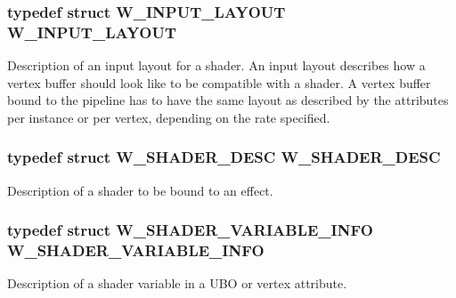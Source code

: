 \subsubsection[{\texorpdfstring{W\+\_\+\+I\+N\+P\+U\+T\+\_\+\+L\+A\+Y\+O\+UT}{W_INPUT_LAYOUT}}]{\setlength{\rightskip}{0pt plus 5cm}typedef struct {\bf W\+\_\+\+I\+N\+P\+U\+T\+\_\+\+L\+A\+Y\+O\+UT}  {\bf W\+\_\+\+I\+N\+P\+U\+T\+\_\+\+L\+A\+Y\+O\+UT}}\hypertarget{group__engineclass_ga4da83d88937c92af31c7178c6dd76b7a}{}\label{group__engineclass_ga4da83d88937c92af31c7178c6dd76b7a}
Description of an input layout for a shader. An input layout describes how a vertex buffer should look like to be compatible with a shader. A vertex buffer bound to the pipeline has to have the same layout as described by the attributes per instance or per vertex, depending on the rate specified. 
\subsubsection[{\texorpdfstring{W\+\_\+\+S\+H\+A\+D\+E\+R\+\_\+\+D\+E\+SC}{W_SHADER_DESC}}]{\setlength{\rightskip}{0pt plus 5cm}typedef struct {\bf W\+\_\+\+S\+H\+A\+D\+E\+R\+\_\+\+D\+E\+SC}  {\bf W\+\_\+\+S\+H\+A\+D\+E\+R\+\_\+\+D\+E\+SC}}\hypertarget{group__engineclass_gae87c08a1640684c24a55606a8700fb5c}{}\label{group__engineclass_gae87c08a1640684c24a55606a8700fb5c}
Description of a shader to be bound to an effect. 
\subsubsection[{\texorpdfstring{W\+\_\+\+S\+H\+A\+D\+E\+R\+\_\+\+V\+A\+R\+I\+A\+B\+L\+E\+\_\+\+I\+N\+FO}{W_SHADER_VARIABLE_INFO}}]{\setlength{\rightskip}{0pt plus 5cm}typedef struct {\bf W\+\_\+\+S\+H\+A\+D\+E\+R\+\_\+\+V\+A\+R\+I\+A\+B\+L\+E\+\_\+\+I\+N\+FO}  {\bf W\+\_\+\+S\+H\+A\+D\+E\+R\+\_\+\+V\+A\+R\+I\+A\+B\+L\+E\+\_\+\+I\+N\+FO}}\hypertarget{group__engineclass_gac58914f40a8d012635bf7704c3a74409}{}\label{group__engineclass_gac58914f40a8d012635bf7704c3a74409}
Description of a shader variable in a U\+BO or vertex attribute. 
